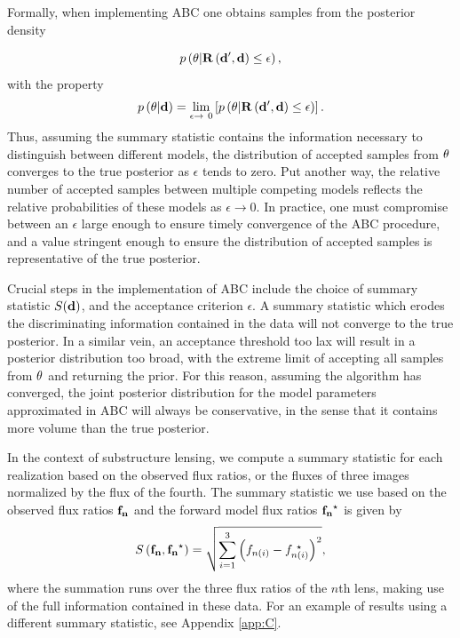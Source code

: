 Formally, when implementing ABC one obtains samples from the posterior density

\begin{equation} \label{eqn:ABCpos}
p\left(\bf{\theta} | R\left(\bf{d^{\prime}},\bf{d}\right) \leq \epsilon \right),
\end{equation}
with the property
\begin{equation}
p\left(\bf{\theta} | \bf{d} \right) = \lim_{\epsilon\to\ 0} \left[ p\left(\bf{\theta} | R\left(\bf{d^{\prime}},\bf{d}\right) \leq \epsilon \right)\right].
\end{equation} 
Thus, assuming the summary statistic contains the information necessary to distinguish between different models, the distribution of accepted samples from $\bf{\theta}$ converges to the true posterior as $\epsilon$ tends to zero. Put another way, the relative number of accepted samples between multiple competing models reflects the relative probabilities of these models as $\epsilon \to 0$. In practice, one must compromise between an $\epsilon$ large enough to ensure timely convergence of the ABC procedure, and a value stringent enough to ensure the distribution of accepted samples is representative of the true posterior. 

Crucial steps in the implementation of ABC include the choice of summary statistic $S(\bf{d})$, and the acceptance criterion $\epsilon$. A summary statistic which erodes the discriminating information contained in the data will not converge to the true posterior. In a similar vein, an acceptance threshold too lax will result in a posterior distribution too broad, with the extreme limit of accepting all samples from $\bf{\theta}$ and returning the prior. For this reason, assuming the algorithm has converged, the joint posterior distribution for the model parameters approximated in ABC will always be conservative, in the sense that it contains more volume than the true posterior. 

In the context of substructure lensing, we compute a summary statistic for each realization based on the observed flux ratios, or the fluxes of three images normalized by the flux of the fourth. The summary statistic we use based on the observed flux ratios ${\bf{f_n}}$ and the forward model flux ratios ${\bf{f_n}^{\star}}$ is given by 
\begin{equation}
\label{eqn:summary_stat}
S \left({\bf{f_n}},{\bf{f_n}^{\star}} \right) = \sqrt{\sum_{i=1}^{3} \left({f_{n\left(i\right)}} - {f_{n\left(i\right)}^{\ \star}}\right)^2},
\end{equation}
where the summation runs over the three flux ratios of the $n$th lens, making use of the full information contained in these data. For an example of results using a different summary statistic, see Appendix \ref{app:C}.

